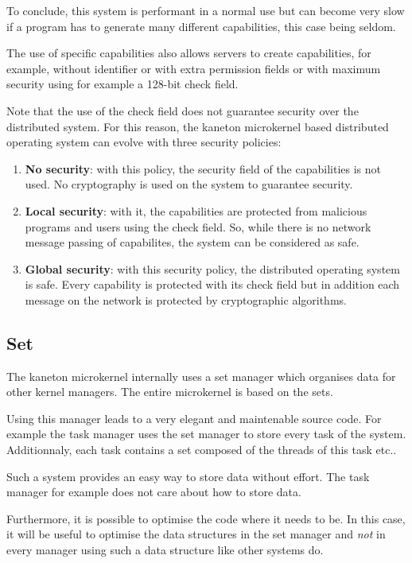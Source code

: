 \begin{multicols}{2}
To conclude, this system is performant in a normal use but can become
very slow if a program has to generate many different capabilities, this
case being seldom.

The use of specific capabilities also allows servers to create capabilities,
for example, without identifier or with extra permission fields or with
maximum security using for example a 128-bit check field.

Note that the use of the check field does not guarantee security over the
distributed system. For this reason, the kaneton microkernel based
distributed operating system can evolve with three security policies:

\begin{enumerate}
  \item
    \textbf{No security}: with this policy, the security field of the
    capabilities is not used. No cryptography is used on the system
    to guarantee security.
  \item
    \textbf{Local security}: with it, the capabilities are protected from
    malicious programs and users using the check field. So, while there
    is no network message passing of capabilites, the system can be
    considered as safe.
  \item
    \textbf{Global security}: with this security policy, the distributed
    operating system is safe. Every capability is protected with its check
    field but in addition each message on the network is protected by
    cryptographic algorithms.
\end{enumerate}

%
%

\subsection{Set}

The kaneton microkernel internally uses a set manager which organises data
for other kernel managers. The entire microkernel is based on the sets.

Using this manager leads to a very elegant and maintenable source code. For
example the task manager uses the set manager to store every task of the
system. Additionnaly, each task contains a set composed of the threads of
this task etc..

Such a system provides an easy way to store data without effort. The task
manager for example does not care about how to store data.

Furthermore, it is possible to optimise the code where it needs to be. In
this case, it will be useful to optimise the data structures in the set
manager and \textit{not} in every manager using such a data structure like
other systems do.


\end{multicols}
